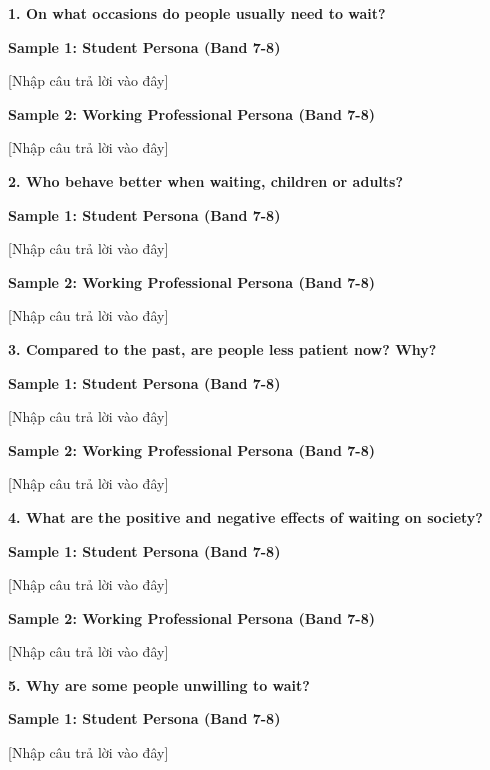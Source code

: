 \partthreeheader

\begin{ieltsquestion}
\textbf{1. On what occasions do people usually need to wait?}
\end{ieltsquestion}
\textbf{Sample 1: Student Persona (Band 7-8)}

[Nhập câu trả lời vào đây]

\textbf{Sample 2: Working Professional Persona (Band 7-8)}

[Nhập câu trả lời vào đây]

\separator

\begin{ieltsquestion}
\textbf{2. Who behave better when waiting, children or adults?}
\end{ieltsquestion}
\textbf{Sample 1: Student Persona (Band 7-8)}

[Nhập câu trả lời vào đây]

\textbf{Sample 2: Working Professional Persona (Band 7-8)}

[Nhập câu trả lời vào đây]

\separator

\begin{ieltsquestion}
\textbf{3. Compared to the past, are people less patient now? Why?}
\end{ieltsquestion}
\textbf{Sample 1: Student Persona (Band 7-8)}

[Nhập câu trả lời vào đây]

\textbf{Sample 2: Working Professional Persona (Band 7-8)}

[Nhập câu trả lời vào đây]

\separator

\begin{ieltsquestion}
\textbf{4. What are the positive and negative effects of waiting on society?}
\end{ieltsquestion}
\textbf{Sample 1: Student Persona (Band 7-8)}

[Nhập câu trả lời vào đây]

\textbf{Sample 2: Working Professional Persona (Band 7-8)}

[Nhập câu trả lời vào đây]

\separator

\begin{ieltsquestion}
\textbf{5. Why are some people unwilling to wait?}
\end{ieltsquestion}
\textbf{Sample 1: Student Persona (Band 7-8)}

[Nhập câu trả lời vào đây]

